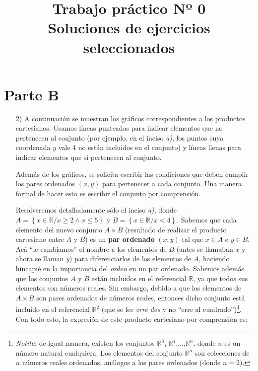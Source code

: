 \documentclass[12pt]{article}
\title{
Trabajo práctico Nº 0\\
\small{Soluciones de ejercicios seleccionados}
}
\begin{document}
\maketitle

\section{Parte B}

\begin{enumerate}
\item[2)] A continuación se muestran los gráficos correspondientes a los productos cartesianos. Usamos líneas punteadas para indicar elementos que no pertenecen al conjunto (por ejemplo, en el inciso \textit{a)}, los puntos cuya coordenada $y$ vale 4 no están incluidos en el conjunto) y líneas llenas para indicar elementos que sí pertenecen al conjunto.\par

\begin{minipage}{\textwidth}
  \centering
  
\end{minipage}
\bigskip

Además de los gráficos, se solicita escribir las condiciones que deben cumplir los pares ordenados $\left(x,y\right)$ para pertenecer a cada conjunto. Una manera formal de hacer esto es escribir el conjunto por comprensión.\par
Resolveremos detalladamente sólo el inciso \textit{a)}, donde $A = \left\{x \in \mathbb{R} / x \geq 2 \wedge x \leq 5\right\}$ y $B = \left\{x \in \mathbb{R} / x < 4\right\}$. Sabemos que cada elemento del nuevo conjunto $A \times B$ (resultado de realizar el producto cartesiano entre $A$ y $B$) es un \textbf{par ordenado} $\left(x,y\right)$ tal que $x \in A$ e $y \in B$. Acá ``le cambiamos'' el nombre a los elementos de $B$ (antes se llamaban $x$ y ahora se llaman $y$) para diferenciarlos de los elementos de $A$, haciendo hincapié en la importancia del \textit{orden} en un par ordenado. Sabemos además que los conjuntos $A$ y $B$ están incluidos en el referencial $\mathbb{R}$, ya que todos sus elementos son números reales. Sin embargo, debido a que los elementos de $A \times B$ son pares ordenados de números reales, entonces dicho conjunto está incluido en el referencial $\mathbb{R}^2$ (que se lee \textit{erre dos} y no ``erre al cuadrado'')\footnote{\textit{Notita}: de igual manera, existen los conjuntos $\mathbb{R}^3$, $\mathbb{R}^4$,...,$\mathbb{R}^n$, donde $n$ es un número natural cualquiera. Los elementos del conjunto $\mathbb{R}^n$ son colecciones de $n$ números reales ordenados, análogos a los pares ordenados (donde $n = 2$).}. Con todo esto, la expresión de este producto cartesiano por comprensión es:


\end{enumerate}
\end{document}
